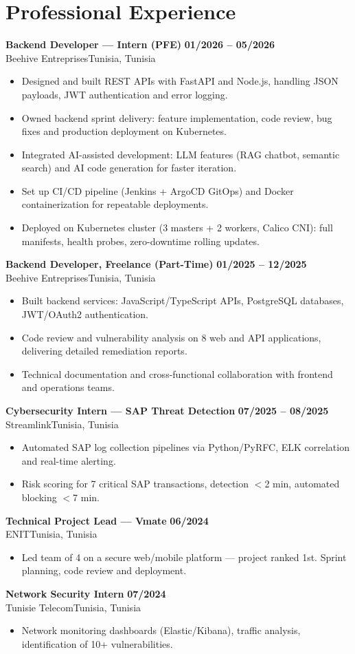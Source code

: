 \documentclass[a4paper,9pt]{article}
\newcommand{\cventry}[4]{\textbf{#1} \hfill \textbf{#4}\\[0.2pt]#2{\ifx\relax#3\relax\else, #3\fi}\par\vspace{0.3pt}}
\begin{document}
\section{Professional Experience}
\cventry{Backend Developer --- Intern (PFE)}{Beehive Entreprises}{Tunisia}{01/2026 -- 05/2026}
\begin{itemize}
  \item Designed and built REST APIs with FastAPI and Node.js, handling JSON payloads, JWT authentication and error logging.
  \item Owned backend sprint delivery: feature implementation, code review, bug fixes and production deployment on Kubernetes.
  \item Integrated AI-assisted development: LLM features (RAG chatbot, semantic search) and AI code generation for faster iteration.
  \item Set up CI/CD pipeline (Jenkins + ArgoCD GitOps) and Docker containerization for repeatable deployments.
  \item Deployed on Kubernetes cluster (3 masters + 2 workers, Calico CNI): full manifests, health probes, zero-downtime rolling updates.
\end{itemize}
\cventry{Backend Developer, Freelance (Part-Time)}{Beehive Entreprises}{Tunisia}{01/2025 -- 12/2025}
\begin{itemize}
  \item Built backend services: JavaScript/TypeScript APIs, PostgreSQL databases, JWT/OAuth2 authentication.
  \item Code review and vulnerability analysis on 8 web and API applications, delivering detailed remediation reports.
  \item Technical documentation and cross-functional collaboration with frontend and operations teams.
\end{itemize}
\cventry{Cybersecurity Intern --- SAP Threat Detection}{Streamlink}{Tunisia}{07/2025 -- 08/2025}
\begin{itemize}
  \item Automated SAP log collection pipelines via Python/PyRFC, ELK correlation and real-time alerting.
  \item Risk scoring for 7 critical SAP transactions, detection $<$2 min, automated blocking $<$7 min.
\end{itemize}
\cventry{Technical Project Lead --- Vmate}{ENIT}{Tunisia}{06/2024}
\begin{itemize}
  \item Led team of 4 on a secure web/mobile platform --- project ranked 1st. Sprint planning, code review and deployment.
\end{itemize}
\cventry{Network Security Intern}{Tunisie Telecom}{Tunisia}{07/2024}
\begin{itemize}
  \item Network monitoring dashboards (Elastic/Kibana), traffic analysis, identification of 10+ vulnerabilities.
\end{itemize}
\end{document}
